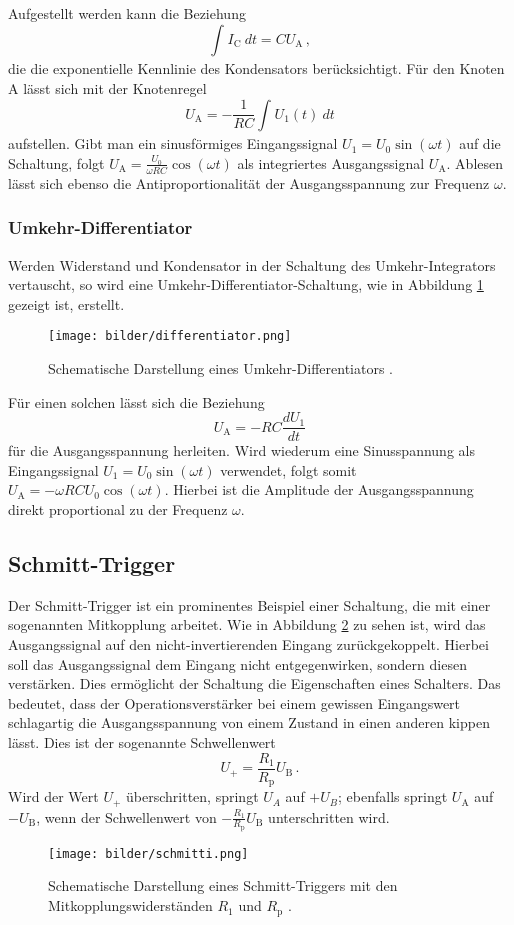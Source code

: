 Aufgestellt werden kann die Beziehung
\begin{equation}
  \int_{}^{} I_\text{C} \ dt=CU_\text{A}\,,
\end{equation}
die die exponentielle Kennlinie des Kondensators berücksichtigt.
Für den Knoten A lässt sich mit der Knotenregel
\begin{equation}
  U_\text{A}=-\frac{1}{RC}\int_{}^{} U_1(t) \ dt
\end{equation}
aufstellen. Gibt man ein sinusförmiges Eingangssignal $U_1=U_0\sin(\omega t)$ auf die Schaltung, folgt $U_\text{A}=\frac{U_0}{\omega RC}\cos(\omega t)$ als integriertes Ausgangssignal $U_\text{A}$. Ablesen lässt sich ebenso die Antiproportionalität der Ausgangsspannung zur Frequenz $\omega$.
\subsubsection{Umkehr-Differentiator}
Werden Widerstand und Kondensator in der Schaltung des Umkehr-Integrators vertauscht, so wird eine Umkehr-Differentiator-Schaltung, wie in Abbildung \ref{differentiator} gezeigt ist, erstellt.

\begin{figure}[H]
  \centering
  \texttt{[image: bilder/differentiator.png]}
  \caption{Schematische Darstellung eines Umkehr-Differentiators \cite{anleitung}.}
  \label{differentiator}
\end{figure}

Für einen solchen lässt sich die Beziehung
\begin{equation}
  U_\text{A}=-RC\frac{dU_1}{dt}
\end{equation}
für die Ausgangsspannung herleiten. Wird wiederum eine Sinusspannung als Eingangssignal $U_1=U_0\sin(\omega t)$ verwendet, folgt somit $U_\text{A}=-\omega RCU_0\cos(\omega t)$. Hierbei ist die Amplitude der Ausgangsspannung direkt proportional zu der Frequenz $\omega$.
\subsection{Schmitt-Trigger}
Der Schmitt-Trigger ist ein prominentes Beispiel einer Schaltung, die mit einer sogenannten Mitkopplung arbeitet. Wie in Abbildung \ref{schmitti} zu sehen ist, wird das Ausgangssignal auf den nicht-invertierenden Eingang zurückgekoppelt. Hierbei soll das Ausgangssignal dem Eingang nicht entgegenwirken, sondern diesen verstärken. Dies ermöglicht der Schaltung die Eigenschaften eines Schalters. Das bedeutet, dass der Operationsverstärker bei einem gewissen Eingangswert schlagartig die Ausgangsspannung von einem Zustand in einen anderen kippen lässt.
Dies ist der sogenannte Schwellenwert
\begin{equation}
U_+=\frac{R_1}{R_\text{p}}U_\text{B}\,.
\label{eq:schmitti}
\end{equation}
Wird der Wert $U_+$ überschritten, springt $U_A$ auf $+U_B$; ebenfalls springt $U_\text{A}$ auf $-U_\text{B}$, wenn der Schwellenwert von $-\frac{R_1}{R_\text{p}}U_\text{B}$ unterschritten wird.

\begin{figure}[H]
  \centering
  \texttt{[image: bilder/schmitti.png]}
  \caption{Schematische Darstellung eines Schmitt-Triggers mit den Mitkopplungswiderständen $R_1$ und $R_\text{p}$ \cite{anleitung}.}
  \label{schmitti}
\end{figure}
